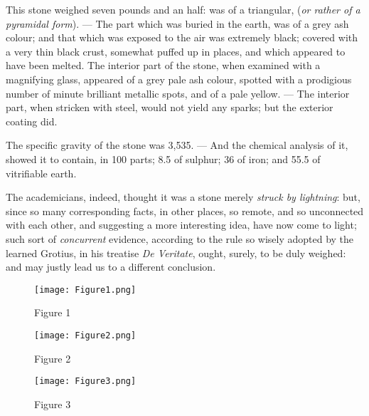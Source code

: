 \documentclass[a4paper, 12pt, oneside]{article}
\begin{document}
This stone weighed seven pounds and an half: was of a triangular, (\emph{or rather of a pyramidal form}). --- The part which was buried in the earth, was of a grey ash colour; and that which was exposed to the air was extremely black; covered with a very thin black crust, somewhat puffed up in places, and which appeared to have been melted. The interior part of the stone, when examined with a magnifying glass, appeared of a grey pale ash colour, spotted with a prodigious number of minute brilliant metallic spots, and of a pale yellow. --- The interior part, when stricken with steel, would not yield any sparks; but the exterior coating did.

The specific gravity of the stone was 3,535. --- And the chemical analysis of it, showed it to contain, in 100 parts; 8.5 of sulphur; 36 of iron; and 55.5 of vitrifiable earth.

The academicians, indeed, thought it was a stone merely \emph{struck by lightning}: but, since so many corresponding facts, in other places, so remote, and so unconnected with each other, and suggesting a more interesting idea, have now come to light; such sort of \emph{concurrent} evidence, according to the rule so wisely adopted by the learned Grotius, in his treatise \emph{De Veritate}, ought, surely, to be duly weighed: and may justly lead us to a different conclusion.
\clearpage
\pagestyle{fancy}
\fancyhf{}
\cfoot{\thepage}
\begin{figure}[b]
\centering
\texttt{[image: Figure1.png]}

Figure 1
\end{figure}
\begin{figure}[b]
\centering
\texttt{[image: Figure2.png]}

Figure 2
\end{figure}
\begin{figure}[b]
\centering
\texttt{[image: Figure3.png]}

Figure 3
\end{figure}

\clearpage
\end{document}
